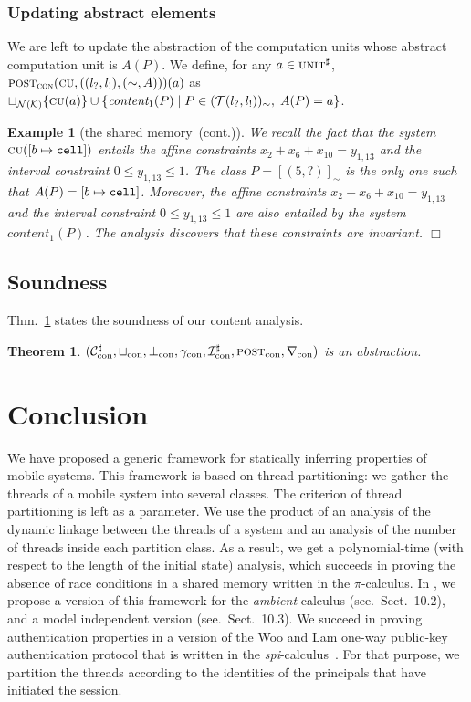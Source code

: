 \documentclass{article}
\newcommand{\boxexample}{$\Box$}
\newtheorem{example}[thm]{Example}
\newtheorem{theorem}[thm]{Theorem}
\newcommand{\picalcul}{$\pi$-calculus}
\newcommand{\ambient}{\emph{ambient}}
\newcommand{\spicalcul}{{\emph{spi}-calculus}}
\newcommand{\rec}{?}
\newcommand{\eme}{!}
\newcommand{\internal}[1]{\textnormal{\texttt{#1}}}
\newcommand{\ccell}{\internal{cell}}
\newcommand{\memlaba}{1}
\newcommand{\memlabb}{2}
\newcommand{\memlabe}{5}
\newcommand{\memlabf}{6}
\newcommand{\memlabj}{10}
\newcommand{\memlabm}{13}
\newcommand{\lrec}{l_{\rec}}
\newcommand{\leme}{l_{\eme}}
\newcommand{\continued}{(cont.)}
\newcommand{\abstractunit}{\textsc{unit}^{\sharp}}
\newcommand{\abst}[1]{\textsc{post}_{#1}}
\newcommand{\aunion}[1]{\sqcup_{#1}}
\newcommand{\adom}[1]{\mathcal{C}_{#1}^{\sharp}}
\newcommand{\abot}[1]{\bot_{#1}}
\newcommand{\conc}[1]{\gamma_{#1}}
\newcommand{\ainit}[1]{\mathcal{I}_{#1}^{\sharp}}
\newcommand{\wid}[1]{\nabla_{#1}}
\newcommand{\tuple}[1]{(\adom{#1},
                        \aunion{#1},
                        \abot{#1},\conc{#1},
                        \ainit{#1},
                        \abst{#1},
                        \wid{#1})}
\newcommand{\shareanalysis}{the shared memory}
\newcommand{\tp}{\textsc{cu}}
\newcommand{\var}{\mathcal{K}}
\newcommand{\numkey}{\textsc{con}}
\newcommand{\abstnum}{\mathcal{N}(\var)}
\newcommand{\cupnum}{\sqcup_{\abstnum}}
\newcommand{\Numkey}{\text{con}}
\newcommand{\ccontentanalysis}{\shareanalysis\ \continued}
\begin{document}
\subsubsection{Updating abstract elements}
We are left to update the abstraction of the computation units whose 
abstract computation unit is $A(P)$. We define, for any $a\in\abstractunit$, $\abst{\numkey}(\tp,((\lrec,\leme),(\sim,A)))(a)$ as $\cupnum \{\tp(a)\}\cup \{\textit{content}_1(P)\;|\;P\in\classes,\;A(P)=a\}$.

\begin{example}[\ccontentanalysis]
We recall the fact that the system $\tp([b\mapsto \ccell])$ entails the affine constraints $x_{\memlabb} + x_{\memlabf} + x_{\memlabj} = y_{\memlaba,\memlabm}$ and the interval constraint $0\leq y_{\memlaba,\memlabm} \leq 1$. 
The class $P=[(\memlabe,\rec)]_\sim$ is the only one such that 
$A(P)=[b\mapsto\ccell]$. Moreover,  the affine constraints $x_{\memlabb} + x_{\memlabf} + x_{\memlabj} = y_{\memlaba,\memlabm}$ and the interval constraint $0\leq y_{\memlaba,\memlabm} \leq 1$ are also entailed by the system $\textit{content}_1(P)$. The analysis discovers that these constraints are invariant.
\boxexample\end{example}

\subsection{Soundness}

Thm.~\ref{contsound} states the soundness of our content analysis.

\begin{theorem}
\label{contsound}
$\tuple{\Numkey}$ is an abstraction.
\end{theorem}


\section{Conclusion}

We have proposed a generic framework for statically inferring properties of mobile systems. This framework is based on thread partitioning: we gather the threads of a mobile system into several classes. The criterion of thread partitioning is left as a parameter. We use the product of an analysis of the dynamic linkage between the threads of a system and an analysis of the number of threads inside each partition class. As a result, we get a polynomial-time (with respect to the length of the initial state) analysis, which succeeds in proving the absence of race conditions in a shared memory  written in the \picalcul.
In \cite[Chap:10]{feret:thesis}, we propose a version of this framework for the \ambient-calculus (see.~Sect.~10.2), and a model independent version (see.~Sect.~10.3). 
We succeed in proving authentication properties in a version \cite{Woo} of the Woo and Lam one-way public-key authentication protocol that is written in the \spicalcul\ \cite{spi}. For that purpose, we partition the threads according to the identities of the principals that have initiated the session. 
\end{document}
